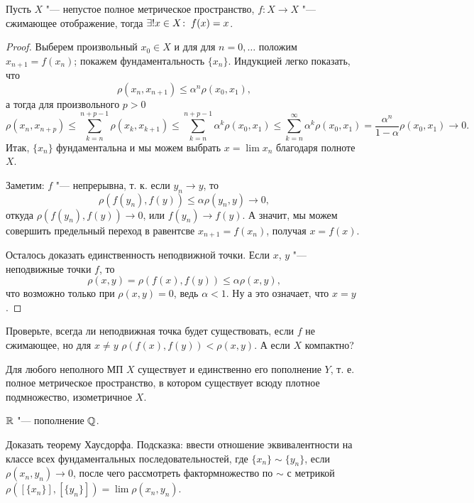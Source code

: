 \documentclass[main]{subfiles}
\begin{document}
\begin{theorem}
  Пусть \( X \) "--- непустое полное метрическое пространство,
  \( f : X \to X \) "--- сжимающее отображение,
  тогда \( \exists! x \in X \colon \: f(x) = x \).
\end{theorem}
\begin{proof}
  Выберем произвольный \( x_0 \in X \) и для
  для \( n = 0, \dots \) положим \( x_{n + 1} = f(x_n) \);
  покажем фундаментальность \( \{ x_n \} \).
  Индукцией легко показать, что
  \[
    \rho(x_n, x_{n+1}) \le \alpha^n \rho(x_0, x_1),
  \]
  а тогда для произвольного \( p > 0 \)
  \[
    \rho(x_n, x_{n+p}) \le
    \sum_{k = n}^{n + p - 1} \rho(x_k, x_{k + 1}) \le
    \sum_{k = n}^{n + p - 1} \alpha^k \rho(x_0, x_1) \le
    \sum_{k = n}^\infty \alpha^k \rho(x_0, x_1) =
    \frac{\alpha^n}{1 - \alpha} \rho(x_0, x_1) \to 0.
  \]
  Итак, \( \{ x_n \} \) фундаментальна и мы можем выбрать
  \( x = \lim x_n \) благодаря полноте \( X \).

  Заметим: \( f \) "--- непрерывна, т. к.
  если \( y_n \to y \), то
  \[
    \rho(f(y_n), f(y)) \le \alpha \rho(y_n, y) \to 0,
  \]
  откуда \( \rho(f(y_n), f(y)) \to 0 \), или
  \( f(y_n) \to f(y) \).
  А значит, мы можем совершить предельный переход
  в равентсве \( x_{n + 1} = f(x_n) \), получая
  \( x = f(x) \).

  Осталось доказать единственность неподвижной точки.
  Если \( x \), \( y \) "--- неподвижные точки \( f \),
  то
  \[
    \rho(x, y) = \rho(f(x), f(y)) \le \alpha \rho(x, y),
  \]
  что возможно только при \( \rho(x, y) = 0 \),
  ведь \( \alpha < 1 \). Ну а это означает, что \( x = y \).
\end{proof}

\begin{exercise}
  Проверьте, всегда ли неподвижная точка будет существовать,
  если \( f \) не сжимающее, но для \( x \ne y \)
  \( \rho(f(x), f(y)) < \rho(x, y) \). А если \( X \) компактно?
\end{exercise}

\begin{theorem}[Хаусдорф, б/д]
  Для любого неполного МП \( X \) существует и единственно его
  пополнение \( Y \), т. е. полное метрическое пространство,
  в котором существует всюду плотное подмножество, изометричное \( X \).
\end{theorem}

\begin{example}
  \( \mathbb{R} \) "--- пополнение \( \mathbb{Q} \).
\end{example}

\begin{exercise}
  Доказать теорему Хаусдорфа. Подсказка: ввести
  отношение эквивалентности на классе всех
  фундаментальных последовательностей,
  где \( \{ x_n \} \sim \{ y_n \} \),
  если \( \rho(x_n, y_n) \to 0 \),
  после чего рассмотреть фактормножество по \( \sim \)
  с метрикой
  \( \rho([\{ x_n \}], [\{ y_n \}]) = \lim \rho(x_n, y_n) \).
\end{exercise}
\end{document}
